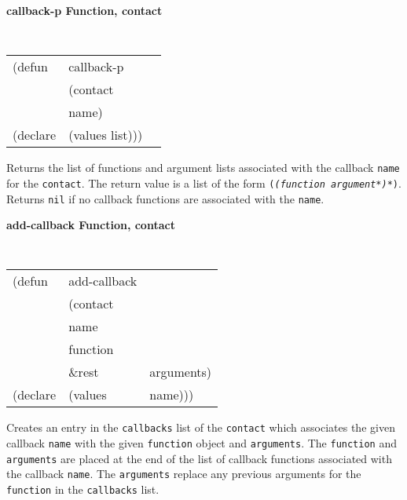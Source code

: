 {\samepage
{\large {\bf callback-p \hfill Function, contact}} 

\begin{flushright} \parbox[t]{6.125in}{
\tt
\begin{tabular}{lll}
\raggedright
(defun & callback-p & \\ 
& (contact\\
&  name)\\
(declare &(values list)))
\end{tabular}
\rm

}\end{flushright}
}

\begin{flushright} 
\parbox[t]{6.125in}{
Returns the list of functions and argument lists associated with the callback
{\tt name} for the {\tt contact}. The return value is a list of the form 
{\tt ({\em (function argument*)*})}.
Returns {\tt nil} if no callback functions are associated with  the {\tt name}.}
\end{flushright}

{\samepage
{\large {\bf add-callback \hfill Function, contact}} 
\begin{flushright} \parbox[t]{6.125in}{
\tt
\begin{tabular}{lll}
\raggedright
(defun & add-callback & \\ 
& (contact\\
& name \\
& function\\
& \&rest & arguments)\\
(declare &(values &name)))
\end{tabular}
\rm

}\end{flushright}}

\begin{flushright} \parbox[t]{6.125in}{
Creates an entry in the {\tt callbacks} list of the {\tt contact} which
associates the given callback {\tt name} with the given {\tt function}
object and {\tt arguments}.
The {\tt function} and {\tt arguments} are placed at the end of the list of
callback functions associated with the callback {\tt name}.
The {\tt arguments} replace any previous arguments for the {\tt function} in the
{\tt callbacks} list.

}\end{flushright}

